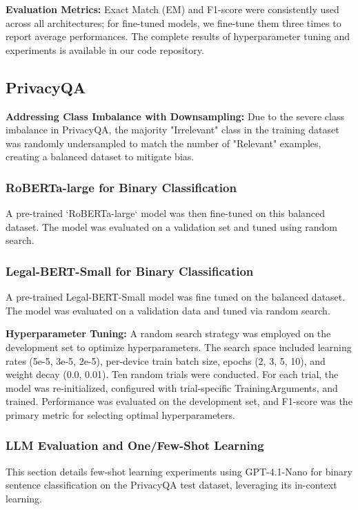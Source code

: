 \documentclass[11pt]{article}
\begin{document}
\textbf{Evaluation Metrics:} Exact Match (EM) and F1-score were consistently used across all architectures; for fine-tuned models, we fine-tune them three times to report average performances. The complete results of hyperparameter tuning and experiments is available in our code repository.

\subsection{PrivacyQA}

\textbf{Addressing Class Imbalance with Downsampling:} Due to the severe class imbalance in PrivacyQA, the majority "Irrelevant" class in the training dataset was randomly undersampled to match the number of "Relevant" examples, creating a balanced dataset to mitigate bias. 

\subsubsection{RoBERTa-large for Binary Classification}
A pre-trained `RoBERTa-large` model was then fine-tuned on this balanced dataset. The model was evaluated on a validation set and tuned using random search.

\subsubsection{Legal-BERT-Small for Binary Classification}

A pre-trained Legal-BERT-Small model was fine tuned on the balanced dataset. The model was evaluated on a validation data and tuned via random search.

\textbf{Hyperparameter Tuning:} A random search strategy was employed on the development set to optimize hyperparameters. The search space included learning rates (5e-5, 3e-5, 2e-5), per-device train batch size, epochs (2, 3, 5, 10), and weight decay (0.0, 0.01). Ten random trials were conducted. For each trial, the model was re-initialized, configured with trial-specific TrainingArguments, and trained. Performance was evaluated on the development set, and F1-score was the primary metric for selecting optimal hyperparameters.

\subsubsection{LLM Evaluation and One/Few-Shot Learning}

This section details few-shot learning experiments using GPT-4.1-Nano for binary sentence classification on the PrivacyQA test dataset, leveraging its in-context learning.
\end{document}
